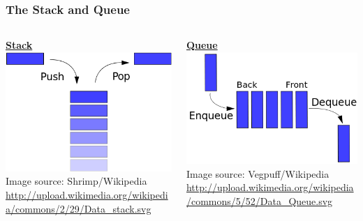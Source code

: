 \begin{frame}
\frametitle{The Stack and Queue}

\vspace{3em}

\begin{columns}
\begin{column}{.48\textwidth}
\begin{center}
\underline{\textbf{Stack}}
\includegraphics[width=\textwidth]{images/data_stack.png}\\
{\tiny Image source: Shrimp/Wikipedia\\
 \url{http://upload.wikimedia.org/wikipedia/commons/2/29/Data_stack.svg}}
\end{center}
\end{column}

\begin{column}{.48\textwidth}
\begin{center}
\underline{\textbf{Queue}}
\includegraphics[width=\textwidth]{images/data_queue.png}\\
{\tiny Image source: Vegpuff/Wikipedia\\
 \url{http://upload.wikimedia.org/wikipedia/commons/5/52/Data_Queue.svg}}

\end{center}
\end{column}
\end{columns}

\end{frame}


